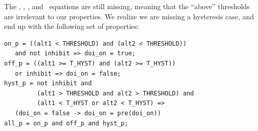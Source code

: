 The {\small { \abovehyst, \aoneabove, \atwoabove,} } and {\small{ \dtwo }} ~equations are still missing, meaning that the ``above'' thresholds are irrelevant to our properties.  We realize we are missing a hysteresis case, and end up with the following set of properties:

{\smaller
\begin{verbatim}
on_p = ((alt1 < THRESHOLD) and (alt2 < THRESHOLD))
   and not inhibit => doi_on = true;
off_p = ((alt1 >= T_HYST) and (alt2 >= T_HYST))
   or inhibit => doi_on = false;
hyst_p = not inhibit and
         (alt1 > THRESHOLD and alt2 > THRESHOLD) and
         (alt1 < T_HYST or alt2 < T_HYST) =>
   (doi_on = false -> doi_on = pre(doi_on))
all_p = on_p and off_p and hyst_p;
\end{verbatim}
}

